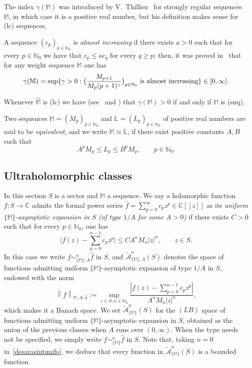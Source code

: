 \documentclass[12pt,leqno]{amsart}
\def\C{\mathbb{C}}
\def\N{\mathbb{N}}
\theoremstyle{plain}
\theoremstyle{definition}
\numberwithin{equation}{section}
\def\L{\mathbb{L}}
\def\bM{\mathbb{M}}
\def\M{\mathbb{M}}
\begin{document}
The index $\gamma(\M)$ was introduced by V.~Thilliez~\cite[Sect.\ 1.3]{Thilliez03} for strongly regular sequences $\M$, in which case it is a positive real number, but his definition makes sense for (lc) sequences.

A sequence $(c_p)_{p\in\N_0}$ is \emph{almost increasing} if there exists $a>0$ such that for every $p\in\N_0$ we have that $c_p\leq a c_q $ for every $ q\geq p$; then, it was proved in~\cite{JimenezSanzSRSPO,JimenezSanzSchindlIndex} that for any weight sequence $\M$ one has
\begin{equation}\label{equa.indice.gammaM.casicrec}
\gamma(\bM)=\sup\{\gamma>0: \big(\frac{M_{p+1}}{M_p(p+1)^\gamma}\big)_{p\in\N_0}\hbox{ is almost increasing} \}\in[0,\infty].
\end{equation}


Whenever $\widehat{\M}$ is (lc) we have (see~\cite[Ch.~2]{PhDJimenez} and \cite[Cor.~3.13]{JimenezSanzSchindlIndex}) that
$\gamma(\M)>0$ if and only if $\M$ is (snq).


Two sequences $\M=(M_{p})_{p\in\N_0}$ and $\L=(L_{p})_{p\in\N_0}$ of positive real numbers are said to be \emph{equivalent}, and we write $\M\approx\L$, if there exist positive constants $A,B$ such that
$$A^pM_p\le L_p\le B^pM_p,\qquad p\in\N_0.$$



\subsection{Ultraholomorphic classes}\label{subsec.UltraHolClasses}

In this section $S$ is a sector and $\M$ a sequence.
We say a holomorphic function   $f:S\to\C$ admits the formal power series $\widehat{f}=\sum_{p=0}^{\infty} c_{p}z^{p}\in\C[[z]]$  as its \emph{uniform $\{\M\}$-asymptotic expansion in $S$ (of type $1/A$ for some $A>0$)} if there exists $C>0$ such that for every $p\in\N_0$, one has
\begin{equation}\Big|f(z)-\sum_{p=0}^{n-1}c_pz^p \Big|\le CA^nM_{n}|z|^n,\qquad z\in S.\label{desarasintunifo}
\end{equation}
In this case we write $f\sim_{\{\M\},A}^u\widehat{f}$ in $S$, and $\widetilde{\mathcal{A}}^u_{\{\M\},A}(S)$ denotes the space of functions admitting uniform $\{\M\}$-asymptotic expansion of type $1/A$ in $S$, endowed with the norm
$$
\left\|f\right\|_{\M,A,\overset{\sim}{u}}:=\sup_{z\in S,n\in\N_{0}}\frac{|f(z)-\sum_{p=0}^{n-1}c_pz^p|}{A^{n}M_{n}|z|^n},
$$
which makes it a Banach space. We set $\widetilde{\mathcal{A}}^u_{\{\M\}}(S)$ for the $(LB)$ space of functions admitting uniform $\{\M\}$-asymptotic expansion in $S$, obtained as the union of the previous classes when $A$ runs over $(0,\infty)$.
When the type needs not be specified, we simply write $f\sim_{\{\M\}}^u\widehat{f}$ in $S$.
Note that, taking $n=0$ in~\eqref{desarasintunifo}, we deduce that every function in $\widetilde{\mathcal{A}}^u_{\{\M\}}(S)$ is a bounded function.
\end{document}
